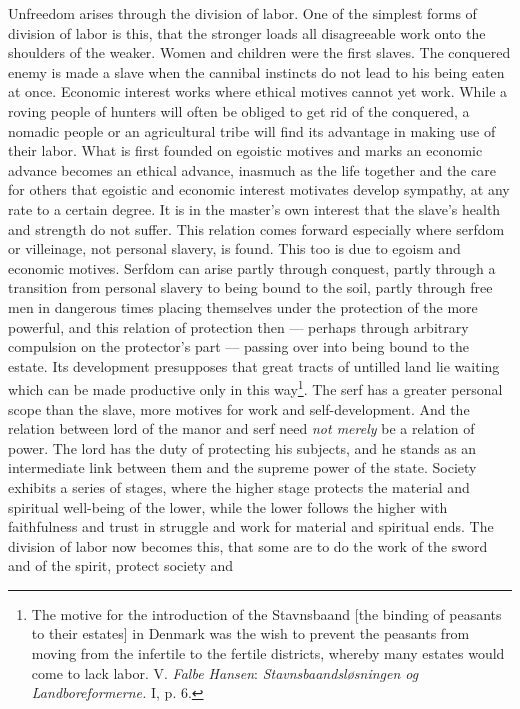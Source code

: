 \documentclass[12pt,a4paper,openany]{book}
\newcommand{\opage}[1]{\marginnote{\footnotesize\textit{[#1]}}}
\begin{document}
Unfreedom arises through the division of labor. One of the simplest forms of division of labor is this, that the
stronger loads all disagreeable work onto the shoulders of the weaker. Women and children were the first slaves. The
conquered enemy is made a slave when the cannibal instincts do not lead to his being eaten at once. Economic interest
works where ethical motives cannot yet work. While a roving people of hunters will often be obliged to get rid of the
conquered, a nomadic people or an agricultural tribe will find its advantage in making use of their labor. What is first
founded on egoistic motives and marks an economic advance becomes an ethical advance, inasmuch as the life together and
the care for others that egoistic and economic interest motivates develop sympathy, at any rate to a certain degree. It is
in the master's own interest that the slave's health and strength do not suffer. This relation comes forward especially
where serfdom or villeinage, not personal slavery, is found. This too is due to egoism and economic motives. Serfdom can
arise partly through conquest, partly through a transition from personal slavery to being bound to the soil, partly
through free men in dangerous times placing themselves under the protection of the more powerful, and this relation of
protection then --- perhaps through arbitrary compulsion on the protector's part --- passing over into being bound to the
estate. Its development presupposes that great tracts of untilled land lie waiting which can be made productive only in
this way\footnote[1]{The motive for the introduction of the Stavnsbaand [the binding of peasants to their estates] in
Denmark was the wish to prevent the peasants from moving from the infertile to the fertile districts, whereby many
estates would come to lack labor. V. \emph{Falbe Hansen}: \textit{Stavnsbaandsløsningen og Landboreformerne.} I, p. 6.}.
The
\opage{348}serf has a greater personal scope than the slave, more motives for work and self-development. And the
relation between lord of the manor and serf need \textit{not merely} be a relation of power. The lord has the duty of
protecting his subjects, and he stands as an intermediate link between them and the supreme power of the state. Society
exhibits a series of stages, where the higher stage protects the material and spiritual well-being of the lower, while
the lower follows the higher with faithfulness and trust in struggle and work for material and spiritual ends. The
division of labor now becomes this, that some are to do the work of the sword and of the spirit, protect society and
\end{document}
